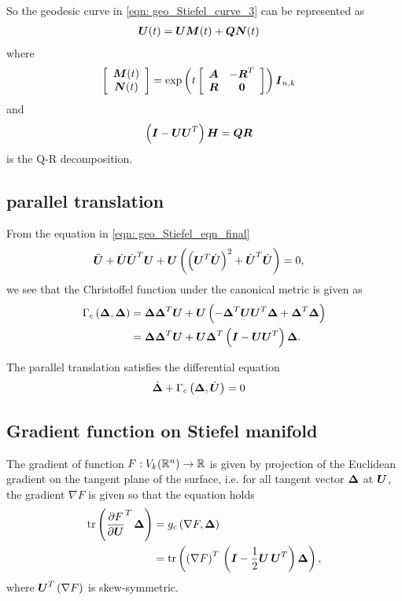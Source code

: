 \documentclass[11pt]{article}
\begin{document}
\begin{enumerate}
So the geodesic curve in \eqref{eqn: geo_Stiefel_curve_3} can be represented as 
\begin{align}
\boldsymbol{U}(t) &= \boldsymbol{U}\boldsymbol{M}(t) +  \boldsymbol{Q}\boldsymbol{N}(t) \label{eqn: geo_Stiefel_curve_4}
\end{align}
where
\begin{align*}
\left[\begin{array}{c}
\boldsymbol{M}(t) \\ 
\boldsymbol{N}(t)
\end{array} \right] 
&=\exp\left(t\left[\begin{array}{cc}
\boldsymbol{A} & -\boldsymbol{R}^{T} \\ 
\boldsymbol{R}& \boldsymbol{0}
\end{array} \right]\right)\boldsymbol{I}_{n,k}
\end{align*}
and 
\begin{align*}
 \left(\boldsymbol{I} - \boldsymbol{U}\boldsymbol{U}^{T}\right)\boldsymbol{H}
&= \boldsymbol{Q}\boldsymbol{R}
\end{align*} is the Q-R decomposition.
\end{enumerate}
\subsection{parallel translation}
From the equation in \eqref{eqn: geo_Stiefel_eqn_final}
\begin{align*}
\ddot{\boldsymbol{U}} +\dot{\boldsymbol{U}}\dot{\boldsymbol{U}}^{T}\boldsymbol{U} +\boldsymbol{U}\left(  \left(\boldsymbol{U}^{T}\dot{\boldsymbol{U}}\right)^{2}   + \dot{\boldsymbol{U}}^{T}\dot{\boldsymbol{U}} \right) &=0,
\end{align*}
we see that the Christoffel function under the canonical metric is given as 
\begin{align}
\Gamma_{c}\left(\boldsymbol{\Delta} , \boldsymbol{\Delta} \right) &= \boldsymbol{\Delta}\boldsymbol{\Delta}^{T}\boldsymbol{U} +\boldsymbol{U}\left(  -\boldsymbol{\Delta}^{T}\boldsymbol{U}\boldsymbol{U}^{T}\boldsymbol{\Delta}  + \boldsymbol{\Delta}^{T}\boldsymbol{\Delta}  \right) \nonumber\\
&= \boldsymbol{\Delta}\boldsymbol{\Delta}^{T}\boldsymbol{U} +\boldsymbol{U}\boldsymbol{\Delta}^{T}\left( \boldsymbol{I} -\boldsymbol{U}\boldsymbol{U}^{T}  \right) \boldsymbol{\Delta}.
\label{eqn: Christoffel_Stiefel}
\end{align}

The parallel translation satisfies the differential equation
\begin{align}
\dot{\boldsymbol{\Delta}} + \Gamma_{c}\left(\boldsymbol{\Delta}, \dot{\boldsymbol{U}} \right)&= 0  \label{eqn: Christoffel_Stiefel_2}
\end{align}
\subsection{Gradient function on Stiefel manifold}
The gradient of function $F: V_{k}({\mathbb R}^{n}) \rightarrow {\mathbb R}$ is given by projection of the Euclidean gradient on the tangent plane of the surface, i.e.  for all tangent vector $\boldsymbol{\Delta}$ at $\boldsymbol{U}$, the gradient $\nabla F$ is given so that the equation holds  
\begin{align}
\mathrm{tr}\left(\frac{\partial F}{ \partial \boldsymbol{U}}^{T}\,\boldsymbol{\Delta}  \right) &= g_{c}\left(\nabla F, \boldsymbol{\Delta}\right) \nonumber\\
&= \mathrm{tr}\left(\left(\nabla F\right)^{T}\,\left(\boldsymbol{I} - \frac{1}{2}\boldsymbol{U\,U}^{T}\right)  \boldsymbol{\Delta} \right) ,
\end{align}
where $\boldsymbol{U}^{T}\left(\nabla F\right)$ is skew-symmetric. 
\end{document}
